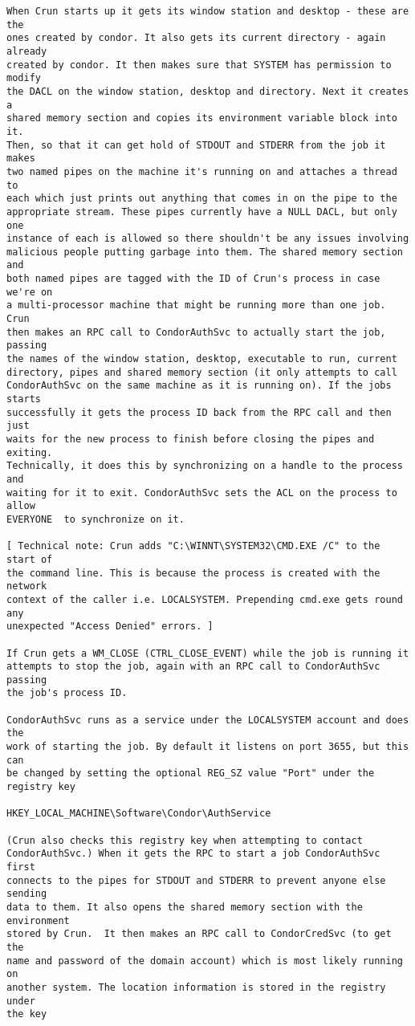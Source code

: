 \begin{description}
\begin{verbatim}
When Crun starts up it gets its window station and desktop - these are the 
ones created by condor. It also gets its current directory - again already 
created by condor. It then makes sure that SYSTEM has permission to modify 
the DACL on the window station, desktop and directory. Next it creates a 
shared memory section and copies its environment variable block into it. 
Then, so that it can get hold of STDOUT and STDERR from the job it makes 
two named pipes on the machine it's running on and attaches a thread to 
each which just prints out anything that comes in on the pipe to the 
appropriate stream. These pipes currently have a NULL DACL, but only one 
instance of each is allowed so there shouldn't be any issues involving 
malicious people putting garbage into them. The shared memory section and 
both named pipes are tagged with the ID of Crun's process in case we're on 
a multi-processor machine that might be running more than one job. Crun 
then makes an RPC call to CondorAuthSvc to actually start the job, passing 
the names of the window station, desktop, executable to run, current 
directory, pipes and shared memory section (it only attempts to call 
CondorAuthSvc on the same machine as it is running on). If the jobs starts 
successfully it gets the process ID back from the RPC call and then just 
waits for the new process to finish before closing the pipes and exiting. 
Technically, it does this by synchronizing on a handle to the process and 
waiting for it to exit. CondorAuthSvc sets the ACL on the process to allow 
EVERYONE  to synchronize on it.

[ Technical note: Crun adds "C:\WINNT\SYSTEM32\CMD.EXE /C" to the start of 
the command line. This is because the process is created with the network 
context of the caller i.e. LOCALSYSTEM. Prepending cmd.exe gets round any 
unexpected "Access Denied" errors. ]

If Crun gets a WM_CLOSE (CTRL_CLOSE_EVENT) while the job is running it 
attempts to stop the job, again with an RPC call to CondorAuthSvc passing 
the job's process ID.

CondorAuthSvc runs as a service under the LOCALSYSTEM account and does the 
work of starting the job. By default it listens on port 3655, but this can 
be changed by setting the optional REG_SZ value "Port" under the registry key

HKEY_LOCAL_MACHINE\Software\Condor\AuthService

(Crun also checks this registry key when attempting to contact 
CondorAuthSvc.) When it gets the RPC to start a job CondorAuthSvc first 
connects to the pipes for STDOUT and STDERR to prevent anyone else sending 
data to them. It also opens the shared memory section with the environment 
stored by Crun.  It then makes an RPC call to CondorCredSvc (to get the 
name and password of the domain account) which is most likely running on 
another system. The location information is stored in the registry under 
the key


\end{verbatim}
\end{description}
